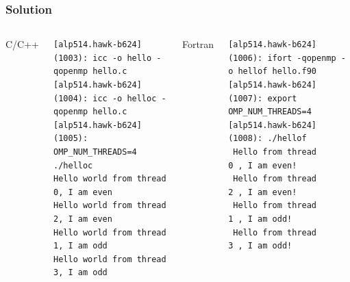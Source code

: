 \documentclass[10pt,t]{beamer}
\begin{document}
\begin{frame}[fragile]
  \frametitle{Solution}
  \begin{columns}
    \begin{exampleblock}{C/C++}
      
    \end{exampleblock}
    \begin{block}{}
      {\fontsize{4}{5}\selectfont
        \begin{Verbatim}
[alp514.hawk-b624](1003): icc -o hello -qopenmp hello.c
[alp514.hawk-b624](1004): icc -o helloc -qopenmp hello.c
[alp514.hawk-b624](1005): OMP_NUM_THREADS=4 ./helloc
Hello world from thread 0, I am even
Hello world from thread 2, I am even
Hello world from thread 1, I am odd
Hello world from thread 3, I am odd
        \end{Verbatim}
      }
    \end{block}
    \begin{exampleblock}{Fortran}
      
    \end{exampleblock}
    \begin{block}{}
      {\fontsize{4}{5}\selectfont
        \begin{Verbatim}
[alp514.hawk-b624](1006): ifort -qopenmp -o hellof hello.f90
[alp514.hawk-b624](1007): export OMP_NUM_THREADS=4
[alp514.hawk-b624](1008): ./hellof
 Hello from thread           0 , I am even!
 Hello from thread           2 , I am even!
 Hello from thread           1 , I am odd!
 Hello from thread           3 , I am odd!
        \end{Verbatim}
      }
    \end{block}
  \end{columns}
\end{frame}
\end{document}

